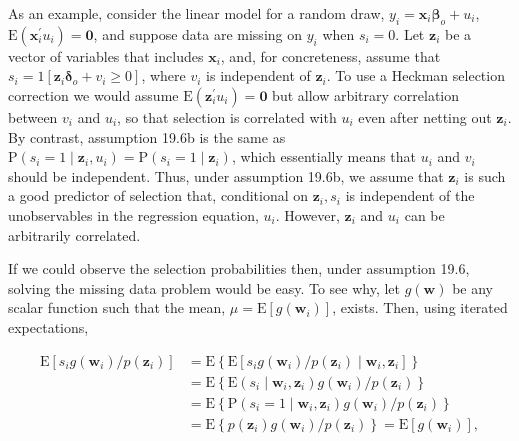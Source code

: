 \documentclass[10pt]{article}
\begin{document}
As an example, consider the linear model for a random draw, $y_{i}=\mathbf{x}_{i} \boldsymbol{\beta}_{o}+u_{i}$, $\mathrm{E}\left(\mathbf{x}_{i}^{\prime} u_{i}\right)=\mathbf{0}$, and suppose data are missing on $y_{i}$ when $s_{i}=0$. Let $\mathbf{z}_{i}$ be a vector of variables that includes $\mathbf{x}_{i}$, and, for concreteness, assume that $s_{i}=1\left[\mathbf{z}_{i} \boldsymbol{\delta}_{o}+v_{i} \geq 0\right]$, where $v_{i}$ is independent of $\mathbf{z}_{i}$. To use a Heckman selection correction we would assume $\mathrm{E}\left(\mathbf{z}_{i}^{\prime} u_{i}\right)=\mathbf{0}$ but allow arbitrary correlation between $v_{i}$ and $u_{i}$, so that selection is correlated with $u_{i}$ even after netting out $\mathbf{z}_{i}$. By contrast, assumption 19.6b is the same as $\mathrm{P}\left(s_{i}=1 \mid \mathbf{z}_{i}, u_{i}\right)=\mathrm{P}\left(s_{i}=1 \mid \mathbf{z}_{i}\right)$, which essentially means that $u_{i}$ and $v_{i}$ should be independent. Thus, under assumption 19.6b, we assume that $\mathbf{z}_{i}$ is such a good predictor of selection that, conditional on $\mathbf{z}_{i}, s_{i}$ is independent of the unobservables in the regression equation, $u_{i}$. However, $\mathbf{z}_{i}$ and $u_{i}$ can be arbitrarily correlated.

If we could observe the selection probabilities then, under assumption 19.6, solving the missing data problem would be easy. To see why, let $g(\mathbf{w})$ be any scalar function such that the mean, $\mu=\mathrm{E}\left[g\left(\mathbf{w}_{i}\right)\right]$, exists. Then, using iterated expectations,


\begin{align*}
\mathrm{E}\left[s_{i} g\left(\mathbf{w}_{i}\right) / p\left(\mathbf{z}_{i}\right)\right] & =\mathrm{E}\left\{\mathrm{E}\left[s_{i} g\left(\mathbf{w}_{i}\right) / p\left(\mathbf{z}_{i}\right) \mid \mathbf{w}_{i}, \mathbf{z}_{i}\right]\right\} \\
& =\mathrm{E}\left\{\mathrm{E}\left(s_{i} \mid \mathbf{w}_{i}, \mathbf{z}_{i}\right) g\left(\mathbf{w}_{i}\right) / p\left(\mathbf{z}_{i}\right)\right\} \\
& =\mathrm{E}\left\{\mathrm{P}\left(s_{i}=1 \mid \mathbf{w}_{i}, \mathbf{z}_{i}\right) g\left(\mathbf{w}_{i}\right) / p\left(\mathbf{z}_{i}\right)\right\} \\
& =\mathrm{E}\left\{p\left(\mathbf{z}_{i}\right) g\left(\mathbf{w}_{i}\right) / p\left(\mathbf{z}_{i}\right)\right\}=\mathrm{E}\left[g\left(\mathbf{w}_{i}\right)\right], \tag{19.82}
\end{align*}
\end{document}

